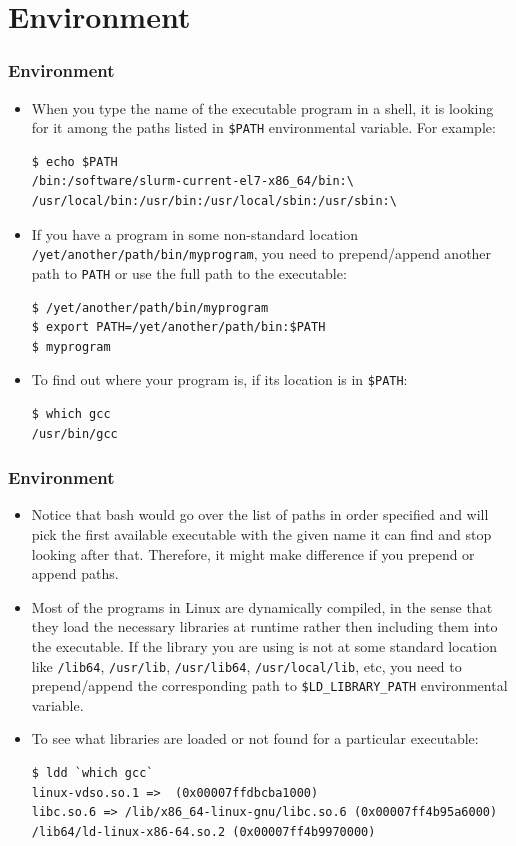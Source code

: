 \documentclass{beamer}
\begin{document}
\section{Environment}
\begin{frame}[fragile]
  \frametitle{Environment}
\begin{itemize}
\item When you type the name of the executable program in a shell, it is looking for it among the paths listed in {\color{mycolorcli}\verb|$PATH|} environmental variable. For example:
{\color{mycolorcli}
\begin{verbatim}
$ echo $PATH
/bin:/software/slurm-current-el7-x86_64/bin:\
/usr/local/bin:/usr/bin:/usr/local/sbin:/usr/sbin:\
\end{verbatim}
}
\item If you have a program in some non-standard location {\color{mycolorcli}\verb|/yet/another/path/bin/myprogram|}, you need to prepend/append another path to {\color{mycolorcli}\verb|PATH|} or use the full path to the executable:
{\color{mycolorcli}
\begin{verbatim}
$ /yet/another/path/bin/myprogram
$ export PATH=/yet/another/path/bin:$PATH
$ myprogram
\end{verbatim}
}
\item To find out where your program is, if its location is in {\color{mycolorcli}\verb|$PATH|}:
{\color{mycolorcli}
\begin{verbatim}
$ which gcc
/usr/bin/gcc
\end{verbatim}
}
\end{itemize}
\end{frame}

\begin{frame}[fragile]
  \frametitle{Environment}
\begin{itemize}
\item Notice that bash would go over the list of paths in order specified and will pick the first available executable with the given name it can find and stop looking after that. 
Therefore, it might make difference if you prepend or append paths.
\item Most of the programs in Linux are dynamically compiled, 
in the sense that they load the necessary libraries at runtime rather then including them into the executable. 
If the library you are using is not at some standard location like
{\color{mycolorcli}\verb|/lib64|}, {\color{mycolorcli}\verb|/usr/lib|}, {\color{mycolorcli}\verb|/usr/lib64|}, 
{\color{mycolorcli}\verb|/usr/local/lib|}, etc, you need to prepend/append the corresponding path to {\color{mycolorcli}\verb|$LD_LIBRARY_PATH|} environmental variable.
\item To see what libraries are loaded or not found for a particular executable:
{\tiny
{\color{mycolorcli}
\begin{verbatim}
$ ldd `which gcc`
linux-vdso.so.1 =>  (0x00007ffdbcba1000)
libc.so.6 => /lib/x86_64-linux-gnu/libc.so.6 (0x00007ff4b95a6000)
/lib64/ld-linux-x86-64.so.2 (0x00007ff4b9970000)
\end{verbatim}
}
}

\end{itemize}
\end{frame}
\end{document}

